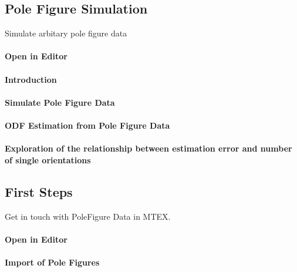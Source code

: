 \documentclass{article}
\begin{document}
		\subsection{Pole Figure Simulation}

		
                     \begin{par}
Simulate arbitary pole figure data
\end{par} \vspace{1em}

                  
			\paragraph{Open in Editor}
		
			\paragraph{Introduction}
		
			\paragraph{Simulate Pole Figure Data}
		
			\paragraph{ODF Estimation from Pole Figure Data}
		
			\paragraph{Exploration of the relationship between estimation error and number of single orientations}
		
		\subsection{First Steps}

		
                     \begin{par}
Get in touch with PoleFigure Data in MTEX.
\end{par} \vspace{1em}

                  
			\paragraph{Open in Editor}
		
			\paragraph{Import of Pole Figures}
		
\end{document}
